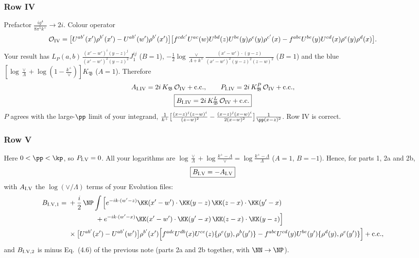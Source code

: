 \subsubsection{Row IV}
Prefactor $\frac{ig^4}{8\pi^5k^+}\to2i$. Colour operator
\[
\mathcal O_{\rm IV}=\big[U^{ab'}(x')\rho^{b'}(x')-U^{ab'}(w')\rho^{b'}(x')\big]\big[f^{cdc'}U^{ac}(w)U^{bd}(z)U^{be}(y)\rho^e(y)\rho^{c'}(x)-f^{abc}U^{be}(y)U^{cd}(x)\rho^e(y)\rho^d(x)\big].
\]
Your result has $L_P(a,b)\,\frac{(x'-w')^i(y-z)^j}{(x'-w')^2(y-z)^2}J_1^{ij}$ ($B=1$), $-\frac12\log\frac{\vee}{\Lambda+k^+}\frac{(x'-w')\cdot(y-z)}{(x'-w')^2(y-z)^2(z-w)^2}$ ($B=1$) and the blue $[\log\frac{\vee}{\Lambda}+\log(1-\frac{k^+}{\vee})]K_{\mathfrak B}$ ($A=1$). Therefore
\begin{gather}
A_{\rm I.IV}=2i\,K_{\mathfrak B}\,\mathcal O_{\rm IV}+{\rm c.c.},\qquad P_{\rm I.IV}=2i\,K^{P}_{\mathfrak B}\,\mathcal O_{\rm IV}+{\rm c.c.},\notag\\
\boxed{B_{\rm I.IV}=2i\,K^{L}_{\mathfrak B}\,\mathcal O_{\rm IV}+{\rm c.c.}}
\end{gather}
$P$ agrees with the large-$\pp$ limit of your integrand, $\frac{1}{k^+}\big[\frac{(x-z)^j(z-w)^i}{(z-w)^2}-\frac{(x-z)^j(x-w)^i}{2(x-w)^2}\big]\frac{1}{\pp(x-z)^2}$. Row IV is correct.

\subsubsection{Row V}
Here $0<\pp<\kp$, so $P_{\rm I.V}=0$. All your logarithms are $\log\frac{\vee}{\Lambda}+\log\frac{k^+-\Lambda}{\vee}=\log\frac{k^+-\Lambda}{\Lambda}$ ($A=1$, $B=-1$). Hence, for parts 1, 2a and 2b,
\begin{equation}
\boxed{B_{\rm I.V}=-A_{\rm I.V}}
\end{equation}
with $A_{\rm I.V}$ the $\log(\vee/\Lambda)$ terms of your Evolution files:
\begin{align}
B_{\rm I.V,1}={}&+\frac i2\,\NP\int\Big[e^{-ik\cdot(w'-z)}\KK(x'-w')\cdot\KK(y-z)\,\KK(z-x)\cdot\KK(y'-x)\notag\\
&\qquad\qquad+e^{-ik\cdot(w'-x)}\KK(x'-w')\cdot\KK(y'-x)\,\KK(z-x)\cdot\KK(y-z)\Big]\notag\\
&\times\big[U^{ab'}(x')-U^{ab'}(w')\big]\rho^{b'}(x')\Big[f^{adc}U^{db}(x)U^{ce}(z)\{\rho^e(y),\rho^b(y')\}-f^{abc}U^{cd}(y)U^{be}(y')\{\rho^d(y),\rho^e(y')\}\Big]+{\rm c.c.},
\end{align}
and $B_{\rm I.V,2}$ is minus Eq.~(4.6) of the previous note (parts 2a and 2b together, with $\NN\to\NP$).

